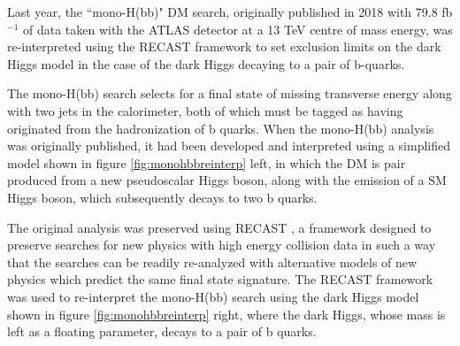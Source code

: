 \documentclass[12pt]{article}
\begin{document}
Last year, the ``mono-H(bb)" DM search, originally published in 2018 \cite{monohbb} with 79.8 fb$^{-1}$ of data taken with the ATLAS detector at a 13 TeV centre of mass energy, was re-interpreted \cite{monohbb_recast} using the RECAST framework \cite{recast} to set exclusion limits on the dark Higgs model in the case of the dark Higgs decaying to a pair of b-quarks. 

The mono-H(bb) search selects for a final state of missing transverse energy along with two jets in the calorimeter, both of which must be tagged as having originated from the hadronization of b quarks. When the mono-H(bb) analysis was originally published, it had been developed and interpreted using a simplified model shown in figure \ref{fig:monohbbreinterp} left, in which the DM is pair produced from a new pseudoscalar Higgs boson, along with the emission of a SM Higgs boson, which subsequently decays to two b quarks.  

The original analysis was preserved using RECAST \cite{recast}, a framework designed to preserve searches for new physics with high energy collision data in such a way that the searches can be readily re-analyzed with alternative models of new physics which predict the same final state signature. The RECAST framework was used to re-interpret the mono-H(bb) search using the dark Higgs model shown in figure \ref{fig:monohbbreinterp} right, where the dark Higgs, whose mass is left as a floating parameter, decays to a pair of b quarks. 
\end{document}
